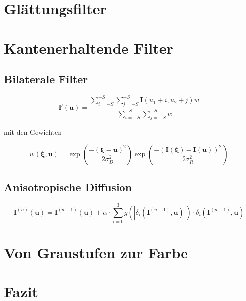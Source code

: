 \documentclass[conference]{IEEEtran}
\begin{document}



\section{Glättungsfilter}

\section{Kantenerhaltende Filter}

\subsection{Bilaterale Filter}

\begin{equation}
\bm{I}'(\bm u) = \frac
{\sum_{i=-S}^{+S} \sum_{j=-S}^{+S} \bm I(u_1 + i, u_2 + j) w}
{\sum_{i=-S}^{+S} \sum_{j=-S}^{+S} w}
\end{equation}

mit den Gewichten

\begin{equation}
w(\bm \xi, \bm u) = 
	\exp \left( 
		\frac{-(\bm \xi - \bm u)^2} {2 \sigma_D^2} 
	\right)
	\exp \left( 
		\frac{-(\bm I (\bm \xi) - \bm I (\bm u))^2} {2 \sigma_R^2} 
	\right)
\end{equation}

\subsection{Anisotropische Diffusion}

\begin{equation}
\bm I^{(n)}(\bm u) = 
	\bm I^{(n-1)}(\bm u) + \alpha 
	\cdot \sum_{i=0}^3 g(|\delta_i (\bm I^{(n-1)}, \bm u)|) 
	\cdot \delta_i (\bm I^{(n-1)}, \bm u)
\end{equation}

\section{Von Graustufen zur Farbe}

\section{Fazit}





\end{document}
